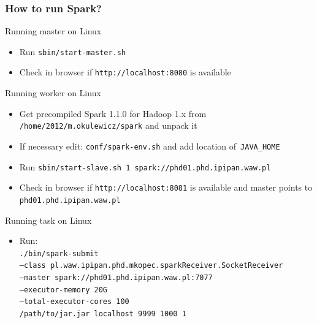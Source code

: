 \documentclass{beamer}
\begin{document}
\begin{frame}[allowframebreaks]
\frametitle{How to run Spark?}

\begin{block}{Running master on Linux}
	\begin{itemize}
		\item Run \texttt{sbin/start-master.sh}
		\item Check in browser if \texttt{http://localhost:8080} is available
	\end{itemize}
\end{block}

\begin{block}{Running worker on Linux}
	\begin{itemize}
		\item Get precompiled Spark 1.1.0 for Hadoop 1.x from \texttt{/home/2012/m.okulewicz/spark} and unpack it
		\item If necessary edit: \texttt{conf/spark-env.sh} and add location of~\texttt{JAVA\_HOME}
		\item Run \texttt{sbin/start-slave.sh 1 spark://phd01.phd.ipipan.waw.pl}
		\item Check in browser if \texttt{http://localhost:8081} is available and master points to \texttt{phd01.phd.ipipan.waw.pl}
	\end{itemize}
\end{block}
	
\begin{block}{Running task on Linux}
	\begin{itemize}
		\item Run: \\
		\texttt{./bin/spark-submit \\
  --class pl.waw.ipipan.phd.mkopec.sparkReceiver.SocketReceiver \\
  --master spark://phd01.phd.ipipan.waw.pl:7077 \\
  --executor-memory 20G \\
  --total-executor-cores 100 \\
  /path/to/jar.jar localhost 9999 1000 1}
	\end{itemize}
\end{block}

\end{frame}

\end{document}
